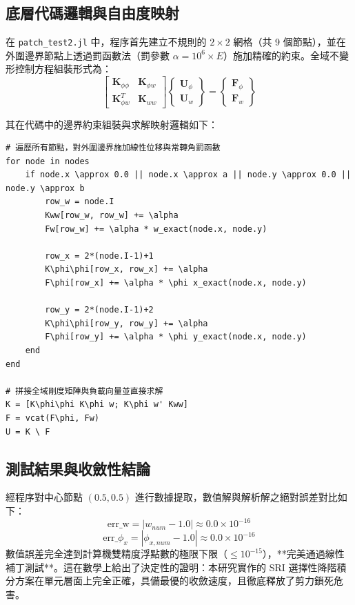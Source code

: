 \subsection{底層代碼邏輯與自由度映射}
在 \texttt{patch\_test2.jl} 中，程序首先建立不規則的 $2 \times 2$ 網格（共 9 個節點），並在外圍邊界節點上透過罰函數法（罰參數 $\alpha = 10^6 \times E$）施加精確的約束。全域不變形控制方程組裝形式為：
\begin{equation}
\begin{bmatrix} \mathbf{K}_{\phi\phi} & \mathbf{K}_{\phi w} \\ \mathbf{K}_{\phi w}^T & \mathbf{K}_{ww} \end{bmatrix} \begin{Bmatrix} \mathbf{U}_\phi \\ \mathbf{U}_w \end{Bmatrix} = \begin{Bmatrix} \mathbf{F}_\phi \\ \mathbf{F}_w \end{Bmatrix}
\end{equation}

其在代碼中的邊界約束組裝與求解映射邏輯如下：
\begin{lstlisting}[caption={patch\_test2.jl 中邊界罰函數強制位移與全域求解映射}]
# 遍歷所有節點，對外圍邊界施加線性位移與常轉角罰函數
for node in nodes
    if node.x \approx 0.0 || node.x \approx a || node.y \approx 0.0 || node.y \approx b
        row_w = node.I
        Kww[row_w, row_w] += \alpha
        Fw[row_w] += \alpha * w_exact(node.x, node.y)

        row_x = 2*(node.I-1)+1
        K\phi\phi[row_x, row_x] += \alpha
        F\phi[row_x] += \alpha * \phi x_exact(node.x, node.y)

        row_y = 2*(node.I-1)+2
        K\phi\phi[row_y, row_y] += \alpha
        F\phi[row_y] += \alpha * \phi y_exact(node.x, node.y)
    end
end

# 拼接全域剛度矩陣與負載向量並直接求解
K = [K\phi\phi K\phi w; K\phi w' Kww]
F = vcat(F\phi, Fw)
U = K \ F
\end{lstlisting}

\subsection{測試結果與收斂性結論}
經程序對中心節點 $(0.5, 0.5)$ 進行數據提取，數值解與解析解之絕對誤差對比如下：
$$\text{err\_w} = |w_{num} - 1.0| \approx 0.0 \times 10^{-16}$$
$$\text{err\_}\phi_x = |\phi_{x,num} - 1.0| \approx 0.0 \times 10^{-16}$$
數值誤差完全達到計算機雙精度浮點數的極限下限（$\le 10^{-15}$），**完美通過線性補丁測試**。這在數學上給出了決定性的證明：本研究實作的 SRI 選擇性降階積分方案在單元層面上完全正確，具備最優的收斂速度，且徹底釋放了剪力鎖死危害。